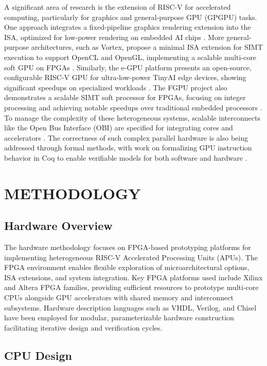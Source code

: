 \documentclass[a4paper,twoside]{article}
\begin{document}
A significant area of research is the extension of RISC-V for accelerated computing, particularly for graphics and general-purpose GPU (GPGPU) tasks. One approach integrates a fixed-pipeline graphics rendering extension into the ISA, optimized for low-power rendering on embedded AI chips \cite{Zhou2020}. More general-purpose architectures, such as Vortex, propose a minimal ISA extension for SIMT execution to support OpenCL and OpenGL, implementing a scalable multi-core soft GPU on FPGAs \cite{Tine2021, Elsabbagh2020}. Similarly, the e-GPU platform presents an open-source, configurable RISC-V GPU for ultra-low-power TinyAI edge devices, showing significant speedups on specialized workloads \cite{Machetti2025}. The FGPU project also demonstrates a scalable SIMT soft processor for FPGAs, focusing on integer processing and achieving notable speedups over traditional embedded processors \cite{AlKadi2016}. To manage the complexity of these heterogeneous systems, scalable interconnects like the Open Bus Interface (OBI) are specified for integrating cores and accelerators \cite{OpenHW2019}. The correctness of such complex parallel hardware is also being addressed through formal methods, with work on formalizing GPU instruction behavior in Coq to enable verifiable models for both software and hardware \cite{Bhatia2019}.

\section{\uppercase{Methodology}}

\subsection{Hardware Overview}

The hardware methodology focuses on FPGA-based prototyping platforms for implementing heterogeneous RISC-V Accelerated Processing Units (APUs). The FPGA environment enables flexible exploration of microarchitectural options, ISA extensions, and system integration. Key FPGA platforms used include Xilinx and Altera FPGA families, providing sufficient resources to prototype multi-core CPUs alongside GPU accelerators with shared memory and interconnect subsystems. Hardware description languages such as VHDL, Verilog, and Chisel have been employed for modular, parameterizable hardware construction facilitating iterative design and verification cycles.

\subsection{CPU Design}
\end{document}
